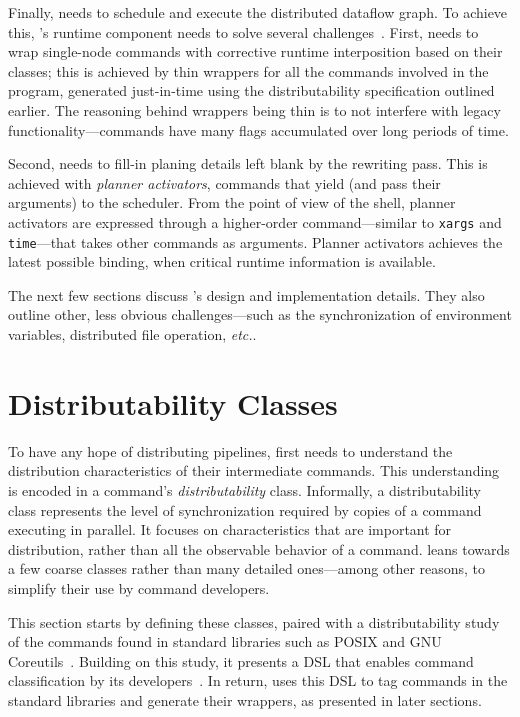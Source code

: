 \documentclass[sigplan,10pt,review,anonymous]{acmart}
\newcommand{\etc}{{\em etc.}\xspace}
\newcommand{\ttt}[1]{\texttt{\small #1}}
\newcommand{\nv}[1]{[{\color{cyan}#1 --- nv}]}
\newcommand{\kk}[1]{[{\color{magenta}#1 --- kk}]}
\begin{document}
Finally, \sys needs to schedule and execute the distributed dataflow graph.
To achieve this, \sys's runtime component needs to solve several challenges~.
First, \sys needs to wrap single-node commands with corrective runtime interposition based on their classes;
  this is achieved by thin wrappers for all the commands involved in the program, generated just-in-time using the distributability specification outlined earlier.
The reasoning behind wrappers being thin is to not interfere with legacy functionality---commands have many flags accumulated over long periods of time.

Second, \sys needs to fill-in planing details left blank by the rewriting pass.
This is achieved with \emph{planner activators}, commands that yield (and pass their arguments) to the scheduler.
From the point of view of the shell, planner activators are expressed through a higher-order command---similar to \ttt{xargs} and \ttt{time}---that takes other commands as arguments.
Planner activators achieves the latest possible binding, when critical runtime information is available.

The next few sections discuss \sys's design and implementation details.
They also outline other, less obvious challenges---such as the synchronization of environment variables, distributed file operation, \etc.


\section{Distributability Classes}
\label{distributability}

To have any hope of distributing \unix pipelines, \sys first needs to understand the distribution characteristics of their intermediate commands.
This understanding is encoded in a command's \emph{distributability} class.
Informally, a distributability class represents the level of synchronization required by copies of a command executing in parallel.
It focuses on characteristics that are important for distribution, rather than all the observable behavior of a command.
\sys leans towards a few coarse classes rather than many detailed ones---among other reasons, to simplify their use by command developers.

This section starts by defining these classes, paired with a distributability study of the commands found in standard libraries such as {\sc POSIX} and GNU Coreutils~.
Building on this study, it presents a DSL that enables command classification by its developers~.
In return, \sys uses this DSL to tag commands in the standard libraries and generate their wrappers, as presented in later sections.
\end{document}

